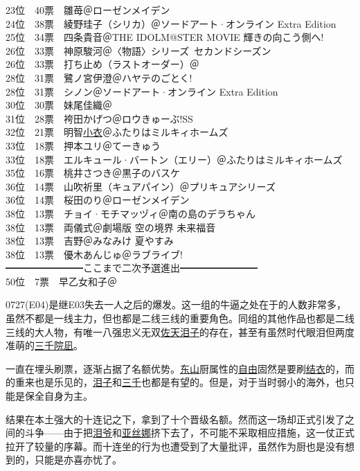 { 23位　40票　雛苺＠ローゼンメイデン\\
 24位　38票　綾野珪子（シリカ）＠ソードアート·オンライン Extra Edition\\
 25位　34票　四条貴音＠THE IDOLM@STER MOVIE 輝きの向こう側へ!\\
 26位　33票　神原駿河＠〈物語〉シリーズ~セカンドシーズン\\
 26位　33票　打ち止め（ラストオーダー）＠\Railgan\\
 28位　31票　鷺ノ宮伊澄＠ハヤテのごとく!\\
 28位　31票　シノン＠ソードアート·オンライン Extra Edition\\
 30位　30票　妹尾佳織＠\Saki\\
 31位　28票　袴田かげつ＠ロウきゅーぶ!SS\\
 32位　21票　明智\uline{小衣}＠ふたりはミルキィホームズ\\
 33位　18票　押本ユリ＠てーきゅう\\
 33位　18票　エルキュール·バートン（エリー）＠ふたりはミルキィホームズ\\
 35位　16票　桃井さつき＠黒子のバスケ\\
 36位　14票　山吹祈里（キュアパイン）＠プリキュアシリーズ\\
 36位　14票　桜田のり＠ローゼンメイデン\\
 38位　13票　チョイ·モチマッヅィ＠南の島のデラちゃん\\
 38位　13票　両儀式＠劇場版 空の境界 未来福音\\
 38位　13票　吉野＠みなみけ 夏やすみ\\
 38位　13票　優木あんじゅ＠ラブライブ!\\
 ━━━━━━━━ここまで二次予選進出━━━━━━━━\\
 50位　7票　早乙女和子＠\Madomagi
}

0727(E04)是继E03失去一人之后的爆发。这一组的牛逼之处在于的人数非常多，虽然不都是一线主力，但也都是二线三线的重要角色。同组的其他作品也都是二线三线的大人物，有唯一八强忠义无双\uline{佐天泪子}的存在，甚至有虽然时代眼泪但两度准萌的\uline{三千院凪}。

一直在埋头刷票，逐渐占据了名额优势。\uline{东山}厨属性的\uline{自由}固然是要刷\uline{结衣}的，而的重来也是乐见的，\uline{泪子}和\uline{三千}也都是有望的。但是，对于当时弱小的海外，也只能是保全自身为主。

结果在本土强大的十连记之下，拿到了十个晋级名额。然而这一场却正式引发了之间的斗争——由于把\uline{泪爷}和\uline{亚丝娜}挤下去了，不可能不采取相应措施，这一仗正式拉开了较量的序幕。而十连坐的行为也遭受到了大量批评，虽然作为厨也是没有想到的，只能是亦喜亦忧了。

